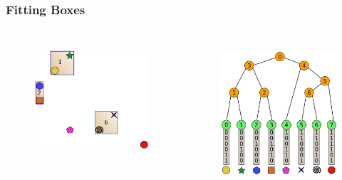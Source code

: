 \documentclass{beamer}
\begin{document}
\begin{frame}
  \frametitle{Fitting Boxes}
  
\begin{columns}[t]

\begin{figure}
\includegraphics[height=45mm]{fit_1.png}
\end{figure}

\begin{figure}
\includegraphics[height=55mm]{radix_tree_bare.png}
\end{figure}
\end{columns}
\end{frame}
\end{document}
